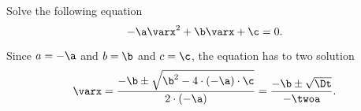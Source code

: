 


\edef\varx{\varx}

\edef\b{\b}



Solve the following equation
\[
  -\a\varx^2+\b\varx+\c=0.
\]

\begin{solution}
Since $a=-\a$ and $b=\b$ and $c=\c$, the equation has to two solution
\[\varx=\frac{-\b\pm\sqrt{\b^2-4\cdot(-\a)\cdot\c}}{2\cdot(-\a)}=\frac{-\b\pm\sqrt{\Dt}}{-\twoa}.\]

\end{solution}